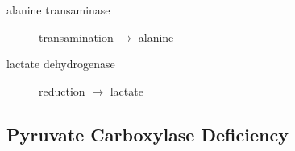 \documentclass{scrartcl}
\begin{document}
\begin{enumerate}

\begin{description}
\item[{alanine transaminase}] transamination \(\to\) alanine
\end{description}


\begin{description}
\item[{lactate dehydrogenase}] reduction \(\to\) lactate
\end{description}

\end{enumerate}

\subsection{Pyruvate Carboxylase Deficiency}
\label{sec:orgec38671}
\end{document}
